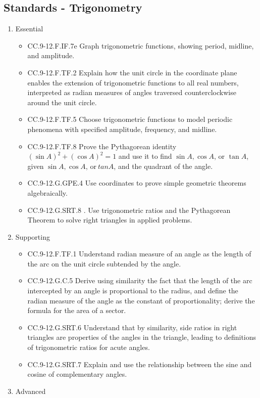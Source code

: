 \documentclass{article}
\begin{document}
\subsection*{Standards - Trigonometry}
\begin{enumerate}
	\item Essential
	\begin{itemize}
		\item CC.9-12.F.IF.7e Graph trigonometric functions, showing period, midline, and amplitude.
		\item CC.9-12.F.TF.2  Explain how the unit circle in the coordinate plane enables the extension of trigonometric functions to all real numbers, interpreted as radian measures of angles traversed counterclockwise around the unit circle.
		\item CC.9-12.F.TF.5  Choose trigonometric functions to model periodic phenomena with specified amplitude, frequency, and midline.
		\item CC.9-12.F.TF.8  Prove the Pythagorean identity $(\sin A)^2 + (\cos A)^2 = 1$ and use it to find $\sin A, \cos A$, or $\tan A$, given $\sin A, \cos A$, or$\ tan A$, and the quadrant of the angle.
		\item CC.9-12.G.GPE.4 Use coordinates to prove simple geometric theorems algebraically. 
		\item CC.9-12.G.SRT.8 . Use trigonometric ratios and the Pythagorean Theorem to solve right triangles in applied problems.
	\end{itemize}		
	\item Supporting
	\begin{itemize}
		\item CC.9-12.F.TF.1 Understand radian measure of an angle as the length of the arc on the unit circle subtended by the angle.
		\item CC.9-12.G.C.5  Derive using similarity the fact that the length of the arc intercepted by an angle is proportional to the radius, and define the radian measure of the angle as the constant of proportionality; derive the formula for the area of a sector.
		\item CC.9-12.G.SRT.6 Understand that by similarity, side ratios in right triangles are properties of the angles in the triangle, leading to definitions of trigonometric ratios for acute angles.
		\item CC.9-12.G.SRT.7  Explain and use the relationship between the sine and cosine of complementary angles.
	\end{itemize}
	\item Advanced

\end{enumerate}
\end{document}
